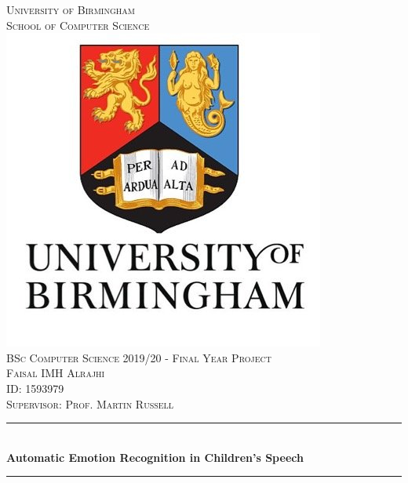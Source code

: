 \documentclass[11pt, a4paper, notitlepage]{report}
\begin{document}
		\begin{titlepage}
		\newcommand{\HRule}{\rule{\linewidth}{0.5mm}} %
		
		\center %
		
		
		\textsc{\LARGE University of Birmingham}\\[0cm] %
		\textsc{\Large School of Computer Science}\\[0.5cm] %
		\includegraphics[scale=0.25]{logo.png}\\[0cm]
		\textsc{\Large BSc Computer Science 2019/20 - Final Year Project}\\[0.5cm]
		\textsc{\Large Faisal IMH Alrajhi}\\[0cm]
		\textsc{\Large ID: 1593979} \\[0.5cm]
		\textsc{\Large Supervisor: Prof. Martin Russell}
		

		\HRule \\[0.4cm]
		{ \huge \bfseries Automatic Emotion Recognition in Children's Speech}\\[0.2cm] %
		\HRule \\[1.5cm]


\end{titlepage}
\end{document}
